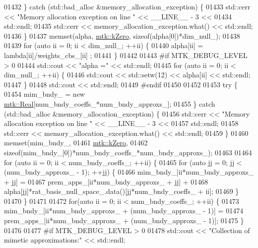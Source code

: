 \begin{DoxyCode}
{{01432   \} \textcolor{keywordflow}{catch} (std::bad\_alloc &memory\_allocation\_exception) \{
01433     std::cerr << \textcolor{stringliteral}{"Memory allocation exception on line "} << \_\_LINE\_\_ - 3 <<
01434       std::endl;
01435     std::cerr << memory\_allocation\_exception.what() << std::endl;
01436   \}
01437   memset(alpha, \hyperlink{group__c01-roots_ga59a451a5fae30d59649bcda274fea271}{mtk::kZero}, \textcolor{keyword}{sizeof}(alpha[0])*dim\_null\_);
01438 
01439   \textcolor{keywordflow}{for} (\textcolor{keyword}{auto} ii = 0; ii < dim\_null\_; ++ii) \{
01440     alpha[ii] = lambda[ii]/weights\_cbs\_[ii] ;
01441   \}
01442 
01443 \textcolor{preprocessor}{  #if MTK\_DEBUG\_LEVEL > 0}
01444   std::cout << \textcolor{stringliteral}{"alpha ="} << std::endl;
01445   \textcolor{keywordflow}{for} (\textcolor{keyword}{auto} ii = 0; ii < dim\_null\_; ++ii) \{
01446     std::cout << std::setw(12) << alpha[ii] << std::endl;
01447   \}
01448   std::cout << std::endl;
01449 \textcolor{preprocessor}{  #endif}
01450 
01452 
01453   \textcolor{keywordflow}{try} \{
01454     mim\_bndy\_ = \textcolor{keyword}{new} \hyperlink{group__c01-roots_gac080bbbf5cbb5502c9f00405f894857d}{mtk::Real}[num\_bndy\_coeffs\_*num\_bndy\_approxs\_];
01455   \} \textcolor{keywordflow}{catch} (std::bad\_alloc &memory\_allocation\_exception) \{
01456     std::cerr << \textcolor{stringliteral}{"Memory allocation exception on line "} << \_\_LINE\_\_ - 3 <<
01457       std::endl;
01458     std::cerr << memory\_allocation\_exception.what() << std::endl;
01459   \}
01460   memset(mim\_bndy\_,
01461          \hyperlink{group__c01-roots_ga59a451a5fae30d59649bcda274fea271}{mtk::kZero},
01462          \textcolor{keyword}{sizeof}(mim\_bndy\_[0])*num\_bndy\_coeffs\_*num\_bndy\_approxs\_);
01463 
01464   \textcolor{keywordflow}{for} (\textcolor{keyword}{auto} ii = 0; ii < num\_bndy\_coeffs\_; ++ii) \{
01465     \textcolor{keywordflow}{for} (\textcolor{keyword}{auto} jj = 0; jj < (num\_bndy\_approxs\_ - 1); ++jj) \{
01466       mim\_bndy\_[ii*num\_bndy\_approxs\_ + jj] =
01467         prem\_apps\_[ii*num\_bndy\_approxs\_ + jj] +
01468         alpha[jj]*rat\_basis\_null\_space\_.data()[jj*num\_bndy\_coeffs\_ + ii];
01469     \}
01470   \}
01471 
01472   \textcolor{keywordflow}{for}(\textcolor{keyword}{auto} ii = 0; ii < num\_bndy\_coeffs\_; ++ii) \{
01473     mim\_bndy\_[ii*num\_bndy\_approxs\_ + (num\_bndy\_approxs\_ - 1)] =
01474       prem\_apps\_[ii*num\_bndy\_approxs\_ + (num\_bndy\_approxs\_ - 1)];
01475   \}
01476 
01477 \textcolor{preprocessor}{  #if MTK\_DEBUG\_LEVEL > 0}
01478   std::cout << \textcolor{stringliteral}{"Collection of mimetic approximations:"} << std::endl;
}}
\end{DoxyCode}
